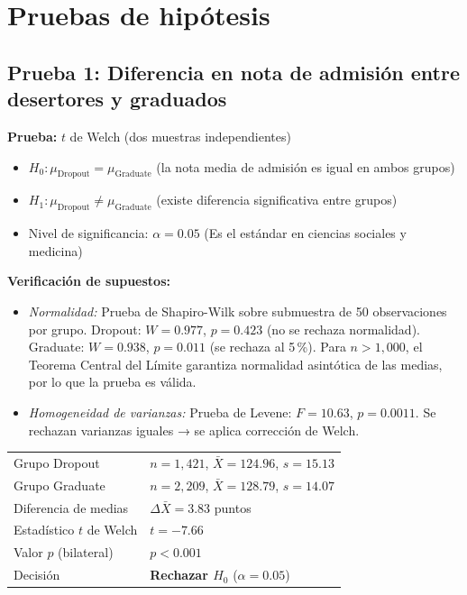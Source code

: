 \documentclass[11pt,a4paper]{article}
\begin{document}
\section{Pruebas de hipótesis}


\subsection{Prueba 1: Diferencia en nota de admisión entre desertores y graduados}

\textbf{Prueba:} $t$ de Welch (dos muestras independientes)

\begin{itemize}[noitemsep]
    \item $H_0: \mu_{\text{Dropout}} = \mu_{\text{Graduate}}$ (la nota media de admisión es igual en ambos grupos)
    \item $H_1: \mu_{\text{Dropout}} \neq \mu_{\text{Graduate}}$ (existe diferencia significativa entre grupos)
    \item Nivel de significancia: $\alpha = 0.05$ (Es el estándar en ciencias sociales y medicina)
\end{itemize}

\textbf{Verificación de supuestos:}
\begin{itemize}[noitemsep]
    \item \textit{Normalidad:} Prueba de Shapiro-Wilk sobre submuestra de 50 observaciones por grupo. Dropout: $W=0.977$, $p=0.423$ (no se rechaza normalidad). Graduate: $W=0.938$, $p=0.011$ (se rechaza al 5\,\%). Para $n>1{,}000$, el Teorema Central del Límite garantiza normalidad asintótica de las medias, por lo que la prueba es válida.
    \item \textit{Homogeneidad de varianzas:} Prueba de Levene: $F=10.63$, $p=0.0011$. Se rechazan varianzas iguales → se aplica corrección de Welch.
\end{itemize}

\begin{resultbox}
\begin{tabular}{ll}
Grupo Dropout  & $n=1{,}421$, $\bar{X}=124.96$, $s=15.13$ \\
Grupo Graduate & $n=2{,}209$, $\bar{X}=128.79$, $s=14.07$ \\
Diferencia de medias & $\Delta\bar{X} = 3.83$ puntos \\
Estadístico $t$ de Welch & $t = -7.66$ \\
Valor $p$ (bilateral)    & $p < 0.001$ \\
Decisión & \textbf{Rechazar $H_0$} ($\alpha = 0.05$) \\
\end{tabular}
\end{resultbox}
\end{document}
